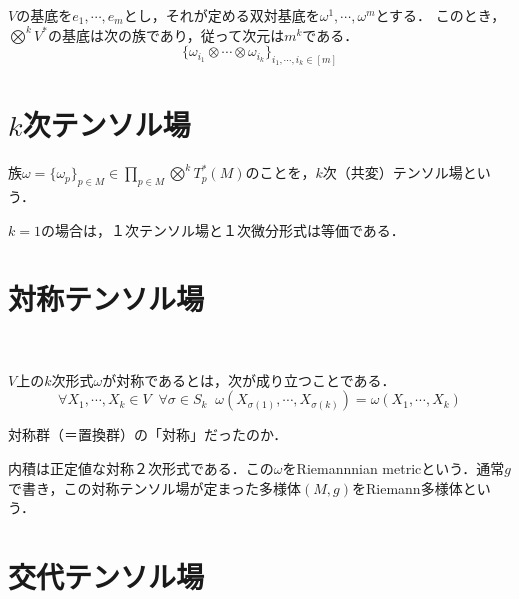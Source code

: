 \documentclass[uplatex, dvipdfmx]{jsreport}
\begin{document}
\begin{proposition}[basis]
    $V$の基底を$e_1,\cdots,e_m$とし，それが定める双対基底を$\omega^1,\cdots,\omega^m$とする．
    このとき，$\bigotimes^kV^*$の基底は次の族であり，従って次元は$m^k$である．
    \[ \{\omega_{i_1}\otimes\cdots\otimes\omega_{i_k}\}_{i_1,\cdots,i_k\in [m]} \]
\end{proposition}

\section{$k$次テンソル場}

\begin{definition}
    族$\omega=\{\omega_p\}_{p\in M}\in\prod_{p\in M}\bigotimes^kT_p^*(M)$のことを，$k$次（共変）テンソル場という．
\end{definition}
\begin{remark}
    $k=1$の場合は，１次テンソル場と１次微分形式は等価である．
\end{remark}

\section{対称テンソル場}

\begin{definition}　

    $V$上の$k$次形式$\omega$が対称であるとは，次が成り立つことである．
    \[ \forall X_1,\cdots,X_k\in V\;\;\forall\sigma\in S_k\;\; \omega(X_{\sigma(1)},\cdots, X_{\sigma(k)})=\omega(X_1,\cdots,X_k) \]
\end{definition}
\begin{remark}
    対称群（＝置換群）の「対称」だったのか．

    内積は正定値な対称２次形式である．この$\omega$をRiemannnian metricという．通常$g$で書き，この対称テンソル場が定まった多様体$(M,g)$をRiemann多様体という．
\end{remark}

\section{交代テンソル場}
\end{document}
